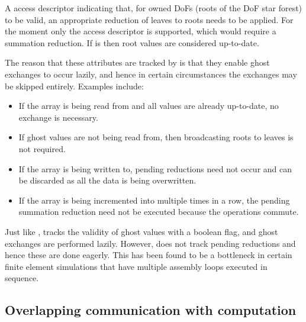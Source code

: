 \documentclass[thesis]{subfiles}
\begin{document}
\begin{paragraph}{}
  A  access descriptor indicating that, for owned DoFs (roots of the DoF star forest) to be valid, an appropriate reduction of leaves to roots needs to be applied.
  For the moment only the  access descriptor is supported, which would require a summation reduction.
  If  is  then root values are considered up-to-date.
\end{paragraph}

The reason that these attributes are tracked by  is that they enable ghost exchanges to occur lazily, and hence in certain circumstances the exchanges may be skipped entirely.
Examples include:

\begin{itemize}
  \item If the array is being read from and all values are already up-to-date, no exchange is necessary.
  \item If ghost values are not being read from, then broadcasting roots to leaves is not required.
  \item If the array is being written to, pending reductions need not occur and can be discarded as all the data is being overwritten.
  \item If the array is being incremented into multiple times in a row, the pending summation reduction need not be executed because the operations commute.
\end{itemize}

\begin{pyopcompare}
  Just like ,  tracks the validity of ghost values with a boolean flag, and ghost exchanges are performed lazily.
  However,  does not track pending reductions and hence these are done eagerly.
  This has been found to be a bottleneck in certain finite element simulations that have multiple assembly loops executed in sequence.
\end{pyopcompare}

\subsection{Overlapping communication with computation}
\end{document}
